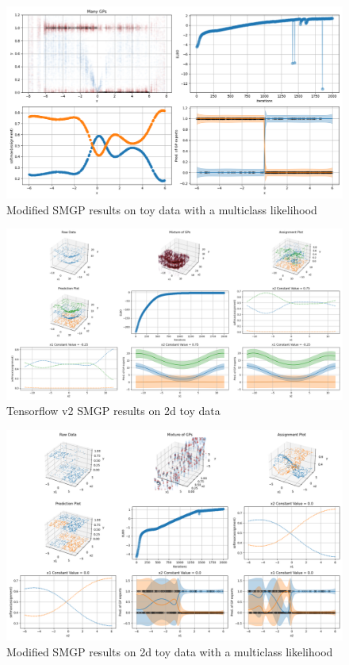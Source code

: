 \documentclass[12pt,a4paper]{report}
\theoremstyle{definition}
\begin{document}
\begin{figure}[H]
    \centering
    \includegraphics[width=\linewidth]{demo_tf2_modified_multiclass.png}
    \caption{Modified SMGP results on toy data with a multiclass likelihood}
    \label{fig:MulticlassSMGPModified}
\end{figure}

\begin{figure}[H]
    \centering
    \includegraphics[width=\linewidth]{demo_tf2_2d.png}
    \caption{Tensorflow v2 SMGP results on 2d toy data}
    \label{fig:2DSMGP}
\end{figure}

\begin{figure}[H]
    \centering
    \includegraphics[width=\linewidth]{demo_tf2_2d_modified_multiclass.png}
    \caption{Modified SMGP results on 2d toy data with a multiclass likelihood}
    \label{fig:2DMulticlassSMGPModified}
\end{figure}
\end{document}
